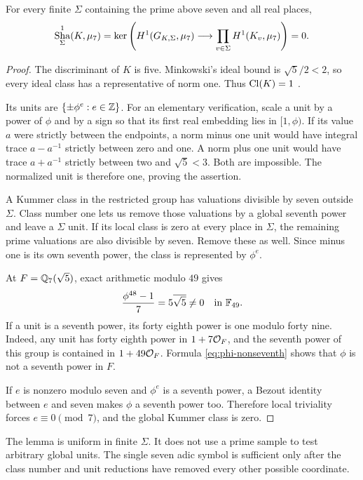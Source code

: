 \begin{lemma}\label{lem:sha1}
For every finite $\Sigma$ containing the prime above seven and all real places,
\[
\mathop{\mathrm{Sha}}^1_\Sigma(K,\mu_7)
=\ker\left(H^1(G_{K,\Sigma},\mu_7)
\longrightarrow\prod_{v\in\Sigma}H^1(K_v,\mu_7)\right)=0.
\]
\end{lemma}
\begin{proof}
The discriminant of $K$ is five. Minkowski's ideal bound is $\sqrt5/2<2$, so every ideal class has a representative of norm one. Thus $\operatorname{Cl}(K)=1$ \cite{milneANT2020}.

Its units are $\{\pm\phi^e:e\in\mathbb Z\}$. For an elementary verification, scale a unit by a power of $\phi$ and by a sign so that its first real embedding lies in $[1,\phi)$. If its value $a$ were strictly between the endpoints, a norm minus one unit would have integral trace $a-a^{-1}$ strictly between zero and one. A norm plus one unit would have trace $a+a^{-1}$ strictly between two and $\sqrt5<3$. Both are impossible. The normalized unit is therefore one, proving the assertion.

A Kummer class in the restricted group has valuations divisible by seven outside $\Sigma$. Class number one lets us remove those valuations by a global seventh power and leave a $\Sigma$ unit. If its local class is zero at every place in $\Sigma$, the remaining prime valuations are also divisible by seven. Remove these as well. Since minus one is its own seventh power, the class is represented by $\phi^e$.

At $F=\mathbb Q_7(\sqrt5)$, exact arithmetic modulo $49$ gives
\begin{equation}\label{eq:phi-nonseventh}
\frac{\phi^{48}-1}{7}=5\overline{\sqrt5}\ne0\quad\text{in }\mathbb F_{49}.
\end{equation}
If a unit is a seventh power, its forty eighth power is one modulo forty nine. Indeed, any unit has forty eighth power in $1+7\mathcal O_F$, and the seventh power of this group is contained in $1+49\mathcal O_F$. Formula \eqref{eq:phi-nonseventh} shows that $\phi$ is not a seventh power in $F$.

If $e$ is nonzero modulo seven and $\phi^e$ is a seventh power, a Bezout identity between $e$ and seven makes $\phi$ a seventh power too. Therefore local triviality forces $e\equiv0\pmod7$, and the global Kummer class is zero.
\end{proof}
The lemma is uniform in finite $\Sigma$. It does not use a prime sample to test arbitrary global units. The single seven adic symbol is sufficient only after the class number and unit reductions have removed every other possible coordinate.

